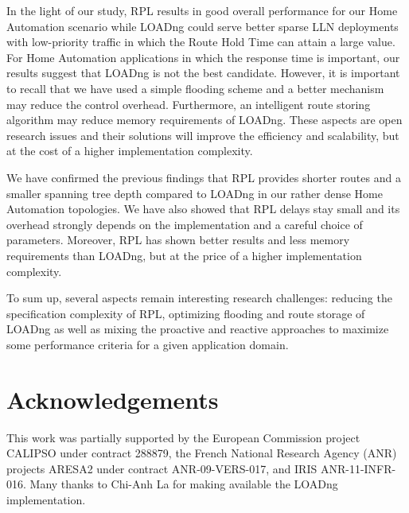 \documentclass[conference,10pt,a4paper]{IEEEtran}
\begin{document}
In the light of our study, RPL results in good overall performance for our
Home Automation scenario while LOADng could serve better sparse LLN deployments
with low-priority traffic in which the Route Hold Time can attain a  large
value. 
For Home Automation applications in which the response time is important, our
results suggest that LOADng is not the best candidate. 
However, it is important to recall that we have used a simple flooding scheme
and a better mechanism may reduce the control overhead. Furthermore, an
intelligent route storing algorithm may reduce memory requirements of
LOADng. These aspects are open research issues and their solutions will improve
the efficiency and scalability, but at the cost of a higher implementation
complexity. 

We have confirmed the previous findings that RPL provides shorter routes and a
smaller spanning tree depth compared to LOADng in our rather dense Home
Automation topologies. We have also showed that RPL delays stay small and
its overhead strongly depends on the implementation and a careful choice of
parameters. Moreover, RPL has shown better results and less memory requirements
than LOADng, but at the price of a higher implementation complexity. 

To sum up, several aspects remain interesting research challenges: reducing the
specification complexity of RPL, optimizing flooding and route storage of
LOADng as well as mixing the proactive and reactive approaches to maximize some
performance criteria for a given application domain. 

\section*{Acknowledgements}

This work was partially supported by the European Commission project CALIPSO
under contract 288879, the French National Research Agency (ANR) projects
ARESA2 under contract ANR-09-VERS-017, and IRIS ANR-11-INFR-016. 
Many thanks to Chi-Anh La for making available the LOADng implementation.

 

\end{document}
